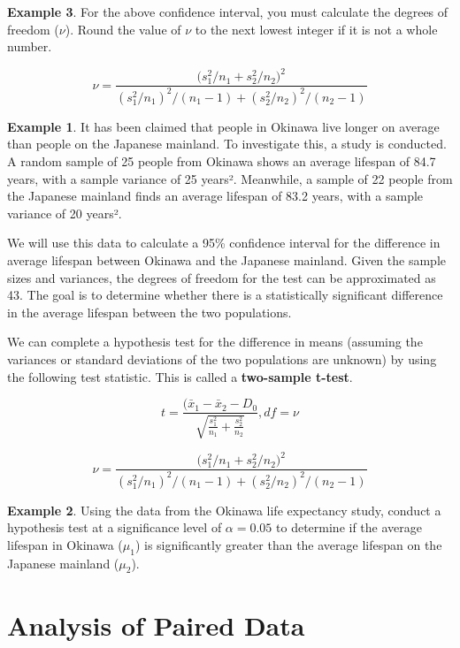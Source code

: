 \documentclass[
  11pt,
  oneside]{book}
\theoremstyle{definition}
\theoremstyle{definition}
\newtheorem{example}{Example}[chapter]
\theoremstyle{definition}
\theoremstyle{definition}
\theoremstyle{remark}
\begin{document}
\begin{example}
For the above confidence interval, you must calculate the degrees of freedom (\(\nu\)). Round the value of \(\nu\) to the next lowest integer if it is not a whole number.

\[\nu = \frac{\big(s_1^2/n_1 + s_2^2/n_2\big)^2}{(s_1^2/n_1)^2/(n_1-1) + (s_2^2/n_2)^2/(n_2-1)}\]

\begin{example}
It has been claimed that people in Okinawa live longer on average than people on the Japanese mainland. To investigate this, a study is conducted. A random sample of 25 people from Okinawa shows an average lifespan of 84.7 years, with a sample variance of 25 years². Meanwhile, a sample of 22 people from the Japanese mainland finds an average lifespan of 83.2 years, with a sample variance of 20 years².

We will use this data to calculate a 95\% confidence interval for the difference in average lifespan between Okinawa and the Japanese mainland. Given the sample sizes and variances, the degrees of freedom for the test can be approximated as 43. The goal is to determine whether there is a statistically significant difference in the average lifespan between the two populations.
\end{example}

\vfill

\newpage

We can complete a hypothesis test for the difference in means (assuming the variances or standard deviations of the two populations are unknown) by using the following test statistic. This is called a \textbf{two-sample t-test}.

\[t= \frac{(\bar{x}_1-\bar{x}_2-D_0}{\sqrt{\frac{s_1^2}{n_1} + \frac{s_2^2}{n_2}}}, df = \nu \]

\[\nu = \frac{\big(s_1^2/n_1 + s_2^2/n_2\big)^2}{(s_1^2/n_1)^2/(n_1-1) + (s_2^2/n_2)^2/(n_2-1)}\]

\begin{example}
Using the data from the Okinawa life expectancy study, conduct a hypothesis test at a significance level of \(\alpha = 0.05\) to determine if the average lifespan in Okinawa (\(\mu_1\)) is significantly greater than the average lifespan on the Japanese mainland (\(\mu_2\)).
\end{example}

\vfill

\newpage

\section{Analysis of Paired Data}\label{analysis-of-paired-data}


\end{example}
\end{document}
